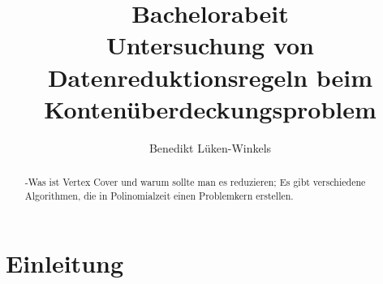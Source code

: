 \documentclass[a4paper]{article}
\begin{document}
\title{Bachelorabeit\\ Untersuchung von Datenreduktionsregeln beim  Kontenüberdeckungsproblem}
\author{Benedikt Lüken-Winkels}
\maketitle
\tableofcontents
\newpage
\begin{abstract}
-Was ist Vertex Cover und warum sollte man es reduzieren; \cite{paper:1} Es gibt verschiedene Algorithmen, die in Polinomialzeit einen Problemkern erstellen.
\end{abstract}
\section{Einleitung}



\newpage
\printbibliography
\end{document}
